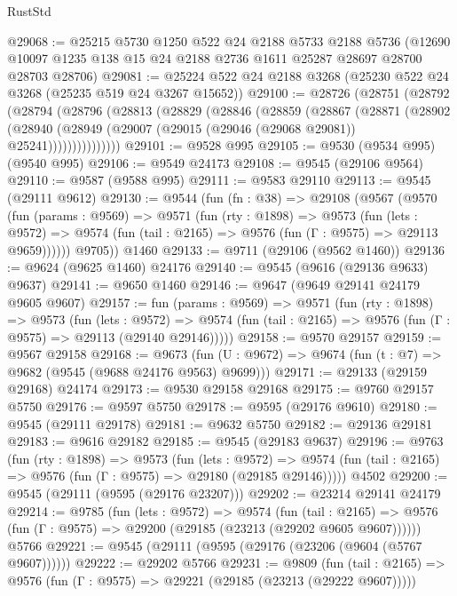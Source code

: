 \begin{lexlean}{RustStd}
\begin{coremodule}
@29068 := @25215
    @5730
    @1250
    @522
    @24
    @2188
    @5733
    @2188
    @5736
    (@12690 @10097 @1235 @138 @15 @24 @2188 @2736 @1611 @25287 @28697 @28700 @28703 @28706)
@29081 := @25224 @522 @24 @2188 @3268 (@25230 @522 @24 @3268 (@25235 @519 @24 @3267 @15652))
@29100 := @28726
    (@28751
      (@28792
        (@28794
          (@28796
            (@28813
              (@28829
                (@28846
                  (@28859
                    (@28867
                      (@28871
                        (@28902
                          (@28940
                            (@28949 (@29007 (@29015 (@29046 (@29068 @29081)) @25241)))))))))))))))
@29101 := @9528 @995
@29105 := @9530 (@9534 @995) (@9540 @995)
@29106 := @9549 @24173
@29108 := @9545 (@29106 @9564)
@29110 := @9587 (@9588 @995)
@29111 := @9583 @29110
@29113 := @9545 (@29111 @9612)
@29130 := @9544
    (fun (fn : @38) =>
    @29108
      (@9567
        (@9570
          (fun (params : @9569) =>
          @9571
            (fun (rty : @1898) =>
            @9573
              (fun (lets : @9572) =>
              @9574 (fun (tail : @2165) => @9576 (fun (Γ : @9575) => @29113 @9659))))))
        @9705))
    @1460
@29133 := @9711 (@29106 (@9562 @1460))
@29136 := @9624 (@9625 @1460) @24176
@29140 := @9545 (@9616 (@29136 @9633) @9637)
@29141 := @9650 @1460
@29146 := @9647 (@9649 @29141 @24179 @9605 @9607)
@29157 := fun (params : @9569) =>
  @9571
    (fun (rty : @1898) =>
    @9573
      (fun (lets : @9572) =>
      @9574 (fun (tail : @2165) => @9576 (fun (Γ : @9575) => @29113 (@29140 @29146)))))
@29158 := @9570 @29157
@29159 := @9567 @29158
@29168 := @9673
    (fun (U : @9672) => @9674 (fun (t : @7) => @9682 (@9545 (@9688 @24176 @9563) @9699)))
@29171 := @29133 (@29159 @29168) @24174
@29173 := @9530 @29158 @29168
@29175 := @9760 @29157 @5750
@29176 := @9597 @5750
@29178 := @9595 (@29176 @9610)
@29180 := @9545 (@29111 @29178)
@29181 := @9632 @5750
@29182 := @29136 @29181
@29183 := @9616 @29182
@29185 := @9545 (@29183 @9637)
@29196 := @9763
    (fun (rty : @1898) =>
    @9573
      (fun (lets : @9572) =>
      @9574 (fun (tail : @2165) => @9576 (fun (Γ : @9575) => @29180 (@29185 @29146)))))
    @4502
@29200 := @9545 (@29111 (@9595 (@29176 @23207)))
@29202 := @23214 @29141 @24179
@29214 := @9785
    (fun (lets : @9572) =>
    @9574
      (fun (tail : @2165) =>
      @9576 (fun (Γ : @9575) => @29200 (@29185 (@23213 (@29202 @9605 @9607))))))
    @5766
@29221 := @9545 (@29111 (@9595 (@29176 (@23206 (@9604 (@5767 @9607))))))
@29222 := @29202 @5766
@29231 := @9809
    (fun (tail : @2165) => @9576 (fun (Γ : @9575) => @29221 (@29185 (@23213 (@29222 @9607)))))

\end{coremodule}
\end{lexlean}
